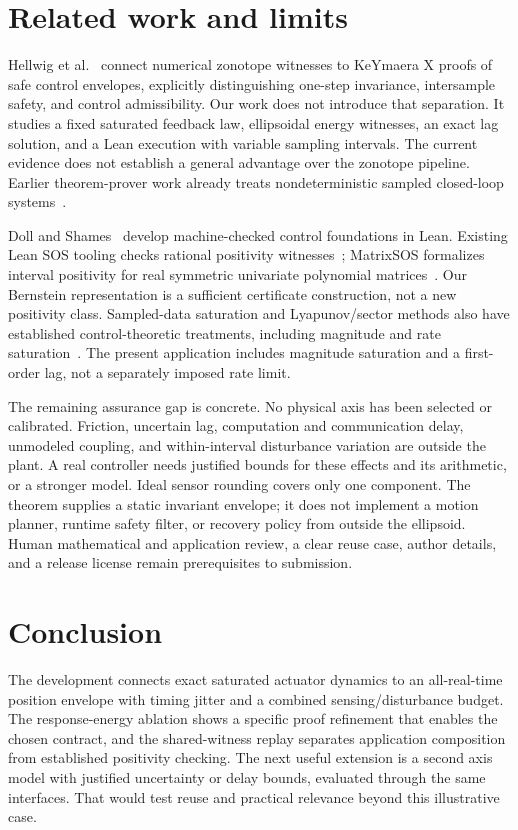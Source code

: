 \documentclass[10pt]{article}
\begin{document}
\section{Related work and limits}
Hellwig et al.~\cite{zonotope} connect numerical zonotope witnesses to KeYmaera X proofs of safe control envelopes, explicitly distinguishing one-step invariance, intersample safety, and control admissibility. Our work does not introduce that separation. It studies a fixed saturated feedback law, ellipsoidal energy witnesses, an exact lag solution, and a Lean execution with variable sampling intervals. The current evidence does not establish a general advantage over the zonotope pipeline. Earlier theorem-prover work already treats nondeterministic sampled closed-loop systems~\cite{closedloop}.

Doll and Shames~\cite{doll} develop machine-checked control foundations in Lean. Existing Lean SOS tooling checks rational positivity witnesses~\cite{sos}; MatrixSOS formalizes interval positivity for real symmetric univariate polynomial matrices~\cite{matrixsos}. Our Bernstein representation is a sufficient certificate construction, not a new positivity class. Sampled-data saturation and Lyapunov/sector methods also have established control-theoretic treatments, including magnitude and rate saturation~\cite{palmeira}. The present application includes magnitude saturation and a first-order lag, not a separately imposed rate limit.

The remaining assurance gap is concrete. No physical axis has been selected or calibrated. Friction, uncertain lag, computation and communication delay, unmodeled coupling, and within-interval disturbance variation are outside the plant. A real controller needs justified bounds for these effects and its arithmetic, or a stronger model. Ideal sensor rounding covers only one component. The theorem supplies a static invariant envelope; it does not implement a motion planner, runtime safety filter, or recovery policy from outside the ellipsoid. Human mathematical and application review, a clear reuse case, author details, and a release license remain prerequisites to submission.

\section{Conclusion}
The development connects exact saturated actuator dynamics to an all-real-time position envelope with timing jitter and a combined sensing/disturbance budget. The response-energy ablation shows a specific proof refinement that enables the chosen contract, and the shared-witness replay separates application composition from established positivity checking. The next useful extension is a second axis model with justified uncertainty or delay bounds, evaluated through the same interfaces. That would test reuse and practical relevance beyond this illustrative case.
\end{document}
